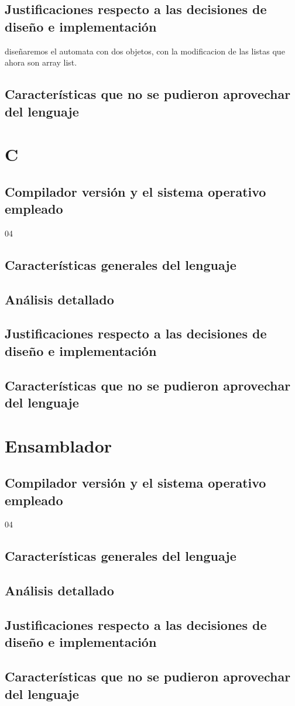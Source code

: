 \documentclass[12pt,a4paper]{article}
\begin{document}
    \subsection{Justificaciones respecto a las decisiones de diseño e implementación}
    diseñaremos el automata con dos objetos, con la modificacion de las listas que ahora son array list.
    \subsection{Características que no se pudieron aprovechar del lenguaje}
      \section{C}
       \subsection{Compilador versión y el sistema operativo empleado}04
        \subsection{Características generales del lenguaje}
        \subsection{Análisis detallado}
        \subsection{Justificaciones respecto a las decisiones de diseño e implementación}
        \subsection{Características que no se pudieron aprovechar del lenguaje}
          \section{Ensamblador}
           \subsection{Compilador versión y el sistema operativo empleado}04
            \subsection{Características generales del lenguaje}
            \subsection{Análisis detallado}
            \subsection{Justificaciones respecto a las decisiones de diseño e implementación}
            \subsection{Características que no se pudieron aprovechar del lenguaje}
\end{document}

